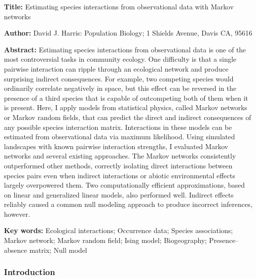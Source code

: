 \documentclass[12pt,]{article}
\date{}
\begin{document}
\begin{spacing}{1.9}
\begin{flushleft}
\renewcommand{\headrulewidth}{0pt}

\setlength{\parskip}{0pt}

\textbf{Title:} Estimating species interactions from observational data
with Markov networks

\textbf{Author:} David J. Harris: Population Biology; 1 Shields Avenue,
Davis CA, 95616

\textbf{Abstract:} Estimating species interactions from observational
data is one of the most controversial tasks in community ecology. One
difficulty is that a single pairwise interaction can ripple through an
ecological network and produce surprising indirect consequences. For
example, two competing species would ordinarily correlate negatively in
space, but this effect can be reversed in the presence of a third
species that is capable of outcompeting both of them when it is present.
Here, I apply models from statistical physics, called Markov networks or
Markov random fields, that can predict the direct and indirect
consequences of any possible species interaction matrix. Interactions in
these models can be estimated from observational data via maximum
likelihood. Using simulated landscapes with known pairwise interaction
strengths, I evaluated Markov networks and several existing approaches.
The Markov networks consistently outperformed other methods, correctly
isolating direct interactions between species pairs even when indirect
interactions or abiotic environmental effects largely overpowered them.
Two computationally efficient approximations, based on linear and
generalized linear models, also performed well. Indirect effects
reliably caused a common null modeling approach to produce incorrect
inferences, however.

\textbf{Key words:} Ecological interactions; Occurrence data; Species
associations; Markov network; Markov random field; Ising model;
Biogeography; Presence--absence matrix; Null model

\subsubsection{Introduction}\label{introduction}

\setlength{\parindent}{1em} \setlength{\parskip}{3pt}


\end{flushleft}
\end{spacing}
\end{document}

